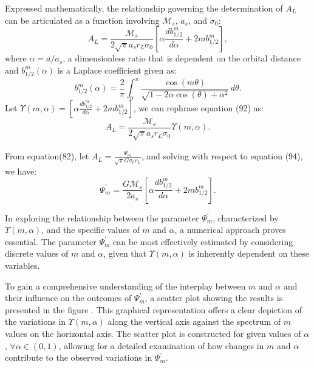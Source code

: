 \documentclass{article}
\begin{document}
Expressed mathematically, the relationship governing the determination of $A_{L}$ can be articulated as a function involving $\mathcal{M}_{s}$, $a_{s}$, and $\sigma_{0}$: 
\begin{equation}
    A_{L} = \frac{\mathcal{M}_{s}}{2\sqrt{\pi}a_{s}r_{L}\sigma_{0}}\left[\alpha \frac{d b_{1/2}^{m}}{d \alpha} + 2mb_{1/2}^{m}\right],
\end{equation}
where $\alpha = a/a_{s}$, a dimensionless ratio that is dependent on the orbital distance and $b_{1/2}^{m}(\alpha)$ is a Laplace coefficient given as\cite{1961mcm..book.....B}\cite{murray_dermott_2000}\cite{1984prin.conf..513S}\cite{articleTisHar}:
\begin{equation}
    b_{1/2}^{m}(\alpha) = \frac{2}{\pi} \int_{0}^{\pi} \frac{\cos(m \theta)}{\sqrt{1 - 2 \alpha \cos(\theta) + \alpha^2}} \, d\theta.
\end{equation}
Let $\Upsilon (m, \alpha) = \left[\alpha \frac{d b_{1/2}^{m}}{d \alpha} + 2mb_{1/2}^{m}\right]$, we can rephrase equation (92) as:
\begin{equation}
    A_{L} = \frac{\mathcal{M}_{s}}{2\sqrt{\pi}a_{s}r_{L}\sigma_{0}}\Upsilon (m,\alpha).
\end{equation}

From equation(82), let $A_{L} = \frac{\Psi_{m}^{'}}{\sqrt{\pi}G\sigma_{0} r_{L}}$, and solving with respect to equation (94), we have:
\begin{equation}
  \Psi_{m}^{'} =  \frac{G \mathcal{M}_{s}}{2a_{s}} \left[\alpha \frac{d b_{1/2}^{m}}{d \alpha} + 2mb_{1/2}^{m}\right].
\end{equation}


In exploring the relationship between the parameter $\Psi_{m}^{'}$, characterized by $\Upsilon(m,\alpha)$, and the specific values of $m$ and $\alpha$, a numerical approach proves essential. The parameter $\Psi_{m}^{'}$ can be most effectively estimated by considering discrete values of $m$ and $\alpha$, given that $\Upsilon(m,\alpha)$ is inherently dependent on these variables.

To gain a comprehensive understanding of the interplay between $m$ and $\alpha$ and their influence on the outcomes of $\Psi_{m}^{'}$, a scatter plot showing the results is presented in the figure . This graphical representation offers a clear depiction of the variations in $\Upsilon(m,\alpha)$ along the vertical axis against the spectrum of $m$ values on the horizontal axis. The scatter plot is constructed for given values of $\alpha$, $\forall \alpha \in (0,1)$, allowing for a detailed examination of how changes in $m$ and $\alpha$ contribute to the observed variations in $\Psi_{m}^{'}$. 
\end{document}
